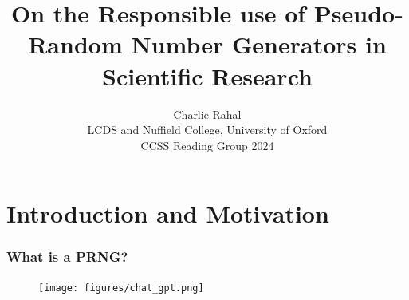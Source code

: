 \documentclass[12pt]{beamer}
\begin{document}
\section{Introduction and Motivation}

\title{On the Responsible use of Pseudo-Random Number Generators in Scientific Research} \vspace{-0.25in}
\author{\footnotesize{Charlie Rahal\\ \vspace{0.05in} LCDS and Nuffield College, University of Oxford\\\vspace{.1in}CCSS Reading Group 2024}\\ \vspace{-0.15in}}
 \date{}

\begin{frame}
\frametitle{What is a PRNG?}
\begin{figure}
	\texttt{[image: figures/chat\_gpt.png]}
\end{figure}
\end{frame}
\end{document}
